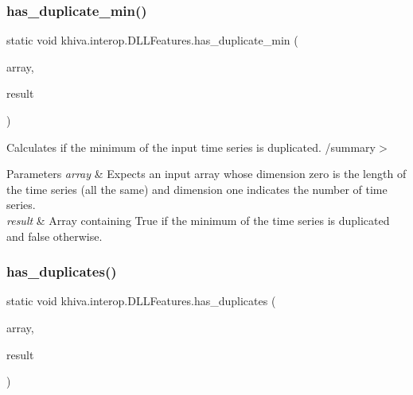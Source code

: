 \mbox{\label{classkhiva_1_1interop_1_1_d_l_l_features_af45a7b69d5140c2d7645facc413cf24c}} 
\subsubsection{\texorpdfstring{has\+\_\+duplicate\+\_\+min()}{has\_duplicate\_min()}}
{\footnotesize\ttfamily static void khiva.\+interop.\+D\+L\+L\+Features.\+has\+\_\+duplicate\+\_\+min (\begin{DoxyParamCaption}\item[{\mbox{[}\+In\mbox{]} ref Int\+Ptr}]{array,  }\item[{\mbox{[}\+Out\mbox{]} out Int\+Ptr}]{result }\end{DoxyParamCaption})\hspace{0.3cm}{\ttfamily [static]}}



Calculates if the minimum of the input time series is duplicated. /summary$>$ 
\begin{DoxyParams}{Parameters}
{\em array} & Expects an input array whose dimension zero is the length of the time series (all the same) and dimension one indicates the number of time series.\\
\hline
{\em result} & Array containing True if the minimum of the time series is duplicated and false otherwise.\\
\hline
\end{DoxyParams}


\mbox{\label{classkhiva_1_1interop_1_1_d_l_l_features_a574c813d82b8d022be812f54bc140788}} 
\subsubsection{\texorpdfstring{has\+\_\+duplicates()}{has\_duplicates()}}
{\footnotesize\ttfamily static void khiva.\+interop.\+D\+L\+L\+Features.\+has\+\_\+duplicates (\begin{DoxyParamCaption}\item[{\mbox{[}\+In\mbox{]} ref Int\+Ptr}]{array,  }\item[{\mbox{[}\+Out\mbox{]} out Int\+Ptr}]{result }\end{DoxyParamCaption})\hspace{0.3cm}{\ttfamily [static]}}



